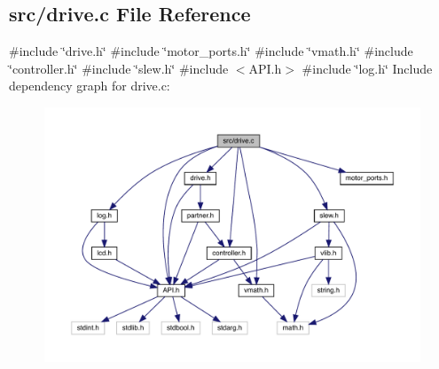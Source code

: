 \subsection{src/drive.c File Reference}
\label{drive_8c}
{\ttfamily \#include \char`\"{}drive.\+h\char`\"{}}\newline
{\ttfamily \#include \char`\"{}motor\+\_\+ports.\+h\char`\"{}}\newline
{\ttfamily \#include \char`\"{}vmath.\+h\char`\"{}}\newline
{\ttfamily \#include \char`\"{}controller.\+h\char`\"{}}\newline
{\ttfamily \#include \char`\"{}slew.\+h\char`\"{}}\newline
{\ttfamily \#include $<$A\+P\+I.\+h$>$}\newline
{\ttfamily \#include \char`\"{}log.\+h\char`\"{}}\newline
Include dependency graph for drive.\+c\+:\nopagebreak
\begin{figure}[H]
\begin{center}
\leavevmode
\includegraphics[width=350pt]{drive_8c__incl}
\end{center}
\end{figure}
